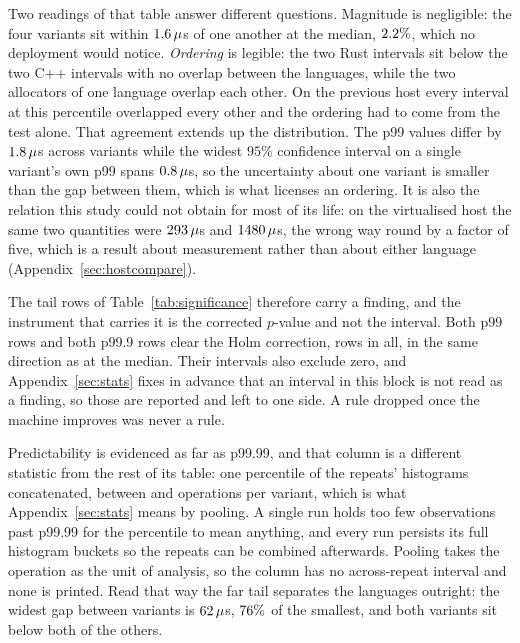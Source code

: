 \documentclass[english,oneside,a4paper,censored,csm,software-track-2020]{HYthesisML}
\begin{document}
Two readings of that table answer different questions. Magnitude is negligible: the four variants
sit within $1.6\,\mu$s of one another at the median, $2.2\%$, which no
deployment would notice. \emph{Ordering} is legible: the two Rust intervals sit below the two C++
intervals with no overlap between the languages, while the two allocators of one language overlap
each other. On the previous host every interval at this percentile overlapped every other and the
ordering had to come from the test alone. That agreement extends up the distribution. The p99
values differ by $1.8\,\mu$s across variants while the widest $95\%$ confidence
interval on a single variant's own p99 spans $0.8\,\mu$s, so the uncertainty about one
variant is smaller than the gap between them, which is what licenses an ordering. It is also the
relation this study could not obtain for most of its life: on the virtualised host the same two
quantities were $293\,\mu$s and $1480\,\mu$s, the wrong way round
by a factor of five, which is a result about measurement rather than about either language
(Appendix~\ref{sec:hostcompare}).

The tail rows of Table~\ref{tab:significance} therefore carry a finding, and the instrument that
carries it is the corrected $p$-value and not the interval. Both p99 rows and both p99.9 rows
clear the Holm correction, \NTailSignificant{} rows in all, in the same direction as at the median.
Their intervals also exclude zero, and Appendix~\ref{sec:stats} fixes in advance that an interval in
this block is not read as a finding, so those are reported and left to one side. A rule dropped
once the machine improves was never a rule.

Predictability is evidenced as far as p99.99, and that column is a different statistic from the
rest of its table: one percentile of the \NRepeats{} repeats' histograms concatenated, between
\FarTailSamplesMin{} and \FarTailSamplesMax{} operations per variant, which is what
Appendix~\ref{sec:stats} means by pooling. A single run holds too few observations past p99.99 for
the percentile to mean anything, and every run persists its full histogram buckets so the repeats
can be combined afterwards. Pooling takes the operation as the unit of analysis, so the column has
no across-repeat interval and none is printed. Read that way the far tail separates the languages
outright: the widest gap between variants is $62\,\mu$s, $76\%$ of the
smallest, and both \FarTailLower{} variants sit below both of the others.
\end{document}
